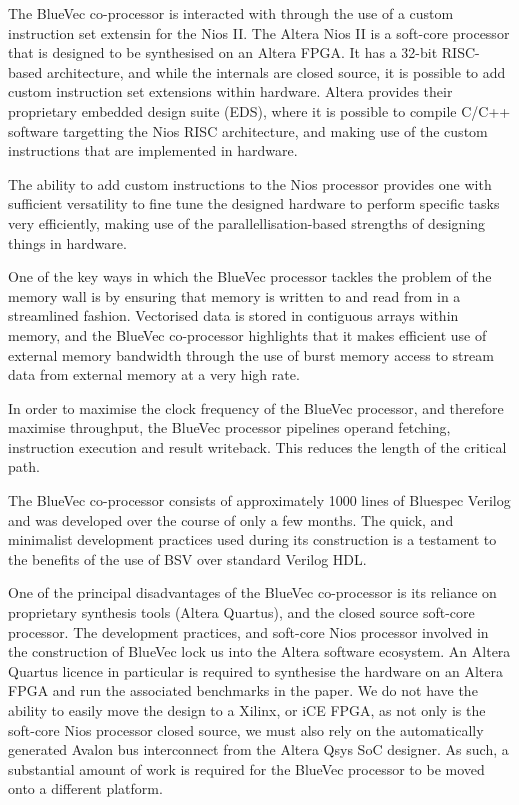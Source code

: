 \documentclass[a4paper,8pt]{report}
\begin{document}
The BlueVec co-processor is interacted with through the use of a custom
instruction set extensin for the Nios II. The Altera Nios II is a soft-core processor
that is designed to be synthesised on an Altera FPGA. It has a 32-bit RISC-based
architecture, and while the internals are closed source, it is possible to add
custom instruction set extensions within hardware. Altera provides their
proprietary embedded design suite (EDS), where it is possible to compile C/C++
software targetting the Nios RISC architecture, and making use of the custom
instructions that are implemented in hardware.

The ability to add custom instructions to the Nios processor provides one with
sufficient versatility to fine tune the designed hardware to perform specific
tasks very efficiently, making use of the parallellisation-based strengths of
designing things in hardware.

One of the key ways in which the BlueVec processor tackles the problem of the
memory wall is by ensuring that memory is written to and read from in a
streamlined fashion. Vectorised data is stored in contiguous arrays within
memory, and the BlueVec co-processor highlights that it makes efficient use of
external memory bandwidth through the use of burst memory access to stream data
from external memory at a very high rate.


In order to maximise the clock frequency of the BlueVec processor, and therefore
maximise throughput, the BlueVec processor pipelines operand fetching,
instruction execution and result writeback. This reduces the length of the
critical path.

The BlueVec co-processor consists of approximately 1000 lines of Bluespec
Verilog and was developed over the course of only a few months. The quick, and
minimalist development practices used during its construction is a testament to
the benefits of the use of BSV over standard Verilog HDL.

One of the principal disadvantages of the BlueVec co-processor is its reliance
on proprietary synthesis tools (Altera Quartus), and the closed source soft-core
processor. The development practices, and soft-core Nios processor involved in
the construction of BlueVec lock us into the Altera software ecosystem. An
Altera Quartus licence in particular is required to synthesise the hardware on
an Altera FPGA and run the associated benchmarks in the paper. We do not have
the ability to easily move the design to a Xilinx, or iCE FPGA, as not only is
the soft-core Nios processor closed source, we must also rely on the
automatically generated Avalon bus interconnect from the Altera Qsys SoC
designer. As such, a substantial amount of work is required for the BlueVec
processor to be moved onto a different platform.
\end{document}
